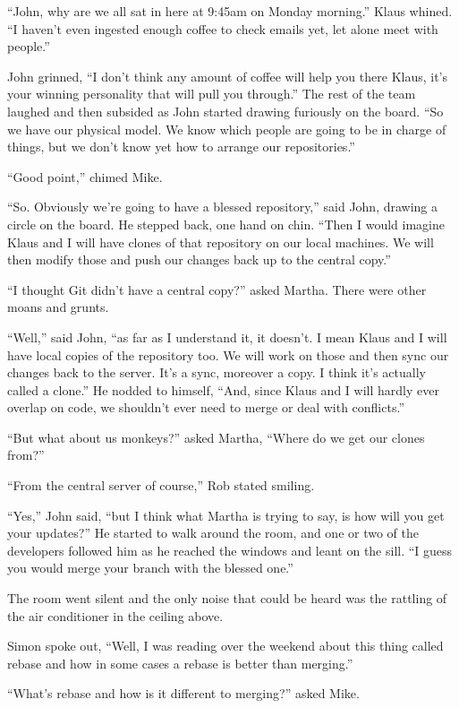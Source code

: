 \begin{trenches}
``John, why are we all sat in here at 9:45am on Monday morning.'' Klaus whined.
``I haven't even ingested enough coffee to check emails yet, let alone meet with people.''

John grinned, ``I don't think any amount of coffee will help you there Klaus, it's your winning personality that will pull you through.''
The rest of the team laughed and then subsided as John started drawing furiously on the board.
``So we have our physical model. We know which people are going to be in charge of things, but we don't know yet how to arrange our repositories.''

``Good point,'' chimed Mike.

``So. Obviously we're going to have a blessed repository,'' said John, drawing a circle on the board.
He stepped back, one hand on chin.
``Then I would imagine Klaus and I will have clones of that repository on our local machines. We will then modify those and push our changes back up to the central copy.''

``I thought Git didn't have a central copy?'' asked Martha.
There were other moans and grunts.

``Well,'' said John,
``as far as I understand it, it doesn't. I mean Klaus and I will have local copies of the repository too. We will work on those and then sync our changes back to the server. It's a sync, moreover a copy. I think it's actually called a clone.''
He nodded to himself, ``And, since Klaus and I will hardly ever overlap on code, we shouldn't ever need to merge or deal with conflicts.''

``But what about us monkeys?'' asked Martha,
``Where do we get our clones from?''

``From the central server of course,'' Rob stated smiling.

``Yes,'' John said,
``but I think what Martha is trying to say, is how will you get your updates?''
He started to walk around the room, and one or two of the developers followed him as he reached the windows and leant on the sill.
``I guess you would merge your branch with the blessed one.''

The room went silent and the only noise that could be heard was the rattling of the air conditioner in the ceiling above.

Simon spoke out, ``Well, I was reading over the weekend about this thing called rebase and how in some cases a rebase is better than merging.''

``What's rebase and how is it different to merging?'' asked Mike.


\end{trenches}
